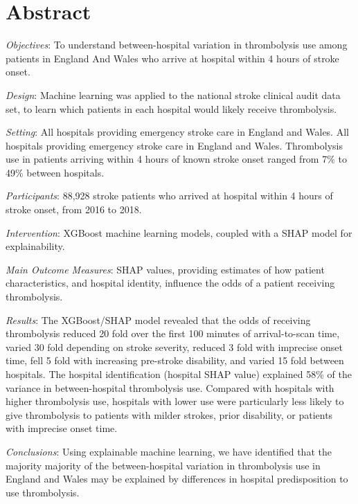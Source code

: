 \section*{Abstract}

\emph{Objectives}: To understand between-hospital variation in thrombolysis use among patients in England And Wales who arrive at hospital within 4 hours of stroke onset.

\emph{Design}: Machine learning was applied to the national stroke clinical audit data set, to learn which patients in each hospital would likely receive thrombolysis.

\emph{Setting}: All hospitals providing emergency stroke care in England and Wales. All hospitals providing emergency stroke care in England and Wales. Thrombolysis use in patients arriving within 4 hours of known stroke onset ranged from 7\% to 49\% between hospitals.

\emph{Participants}: 88,928 stroke patients who arrived at hospital within 4 hours of stroke onset, from 2016 to 2018.

\emph{Intervention}: XGBoost machine learning models, coupled with a SHAP model for explainability.

\emph{Main Outcome Measures}: SHAP values, providing estimates of how patient characteristics, and hospital identity, influence the odds of a patient receiving thrombolysis.

\emph{Results}: The XGBoost/SHAP model revealed that the odds of receiving thrombolysis reduced 20 fold over the first 100 minutes of arrival-to-scan time, varied 30 fold depending on stroke severity, reduced 3 fold with imprecise onset time, fell 5 fold with increasing pre-stroke disability, and varied 15 fold between hospitals. The hospital identification (hospital SHAP value) explained 58\% of the variance in between-hospital thrombolysis use. Compared with hospitals with higher thrombolysis use, hospitals with lower use were particularly less likely to give thrombolysis to patients with milder strokes, prior disability, or patients with imprecise onset time.

\emph{Conclusions}: Using explainable machine learning, we have identified that the majority majority of the between-hospital variation in thrombolysis use in England and Wales may be explained by differences in hospital predisposition to use thrombolysis.